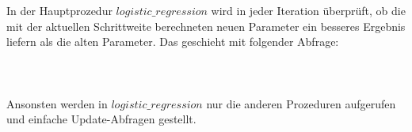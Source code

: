 In der Hauptprozedur $logistic\_regression$ wird in jeder Iteration überprüft, ob die mit der aktuellen Schrittweite berechneten neuen Parameter ein besseres Ergebnis liefern als die alten Parameter. Das geschieht mit folgender Abfrage:
\\\\
\noindent{}
\\\\
Ansonsten werden in $logistic\_regression$ nur die anderen Prozeduren aufgerufen und einfache Update-Abfragen gestellt.

